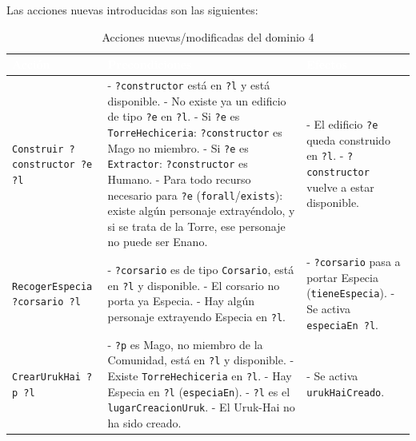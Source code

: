 \documentclass[10pt]{article}
\begin{document}
Las acciones nuevas introducidas son las siguientes:
 
\begin{table}[H]
    \centering
    \begin{tabular}{| m{4cm} | m{6cm} | m{6cm} |}
        \hline
        \rowcolor{maincolor}
        \textcolor{white}{\textbf{Acción}} &
        \centering\arraybackslash\textcolor{white}{\textbf{Precondiciones}} &
        \textcolor{white}{\textbf{Efectos}} \\
        \hline
        \texttt{Construir ?constructor ?e ?l} &
        - \texttt{?constructor} está en \texttt{?l} y está disponible. \newline
        - No existe ya un edificio de tipo \texttt{?e} en \texttt{?l}. \newline
        - Si \texttt{?e} es \texttt{TorreHechiceria}: \texttt{?constructor} es Mago no miembro. \newline
        - Si \texttt{?e} es \texttt{Extractor}: \texttt{?constructor} es Humano. \newline
        - Para todo recurso necesario para \texttt{?e} (\texttt{forall}/\texttt{exists}): existe algún personaje extrayéndolo, y si se trata de la Torre, ese personaje no puede ser Enano. &
        - El edificio \texttt{?e} queda construido en \texttt{?l}. \newline
        - \texttt{?constructor} vuelve a estar disponible. \\
        \hline
        \texttt{RecogerEspecia ?corsario ?l} &
        - \texttt{?corsario} es de tipo \texttt{Corsario}, está en \texttt{?l} y disponible. \newline
        - El corsario no porta ya Especia. \newline
        - Hay algún personaje extrayendo Especia en \texttt{?l}. &
        - \texttt{?corsario} pasa a portar Especia (\texttt{tieneEspecia}). \newline
        - Se activa \texttt{especiaEn ?l}. \\
        \hline
        \texttt{CrearUrukHai ?p ?l} &
        - \texttt{?p} es Mago, no miembro de la Comunidad, está en \texttt{?l} y disponible. \newline
        - Existe \texttt{TorreHechiceria} en \texttt{?l}. \newline
        - Hay Especia en \texttt{?l} (\texttt{especiaEn}). \newline
        - \texttt{?l} es el \texttt{lugarCreacionUruk}. \newline
        - El Uruk-Hai no ha sido creado. &
        - Se activa \texttt{urukHaiCreado}. \\
        \hline
    \end{tabular}
    \caption{Acciones nuevas/modificadas del dominio 4}
    \label{tab:acciones_dom4}
\end{table}
\end{document}
